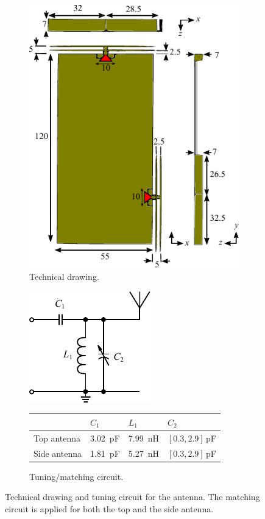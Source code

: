 \begin{figure}[htbp]
    \begin{subfigure}[t]{0.49\linewidth}
        \centering
        \includegraphics{img/tech_sol/monopole/highband/3d_drawing}
        \caption{Technical drawing.}
        \label{fig:ant1technical_highband}
    \end{subfigure}
    \hfill
    \begin{subfigure}[t]{0.49\linewidth}
        \centering
        \includegraphics{img/tech_sol/schematic_tuning_1}\\[1cm]
\footnotesize
        \begin{tabular}{|l|l|l|l|}
            \hline
            & $C_1$ & $L_1$ & $C_2$ \\
            \hline
            Top antenna & \SI{3.02}{pF} & \SI{7.99}{nH} & $[0.3,2.9]\,$pF\\
            Side antenna & \SI{1.81}{pF} & \SI{5.27}{nH} & $[0.3,2.9]\,$pF\\
            \hline
        \end{tabular}
        \caption{Tuning/matching circuit.}
        \label{fig:ant1_tuning_highband}
    \end{subfigure}
    \caption{Technical drawing and tuning circuit for the antenna.  The matching circuit is applied for both the top and the side antenna.}
    \label{fig:sparam_5mm_highband}
\end{figure}

